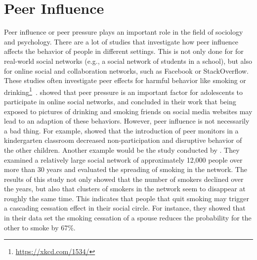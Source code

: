 

\section{Peer Influence}
\label{sec:peer-influence}

Peer influence or peer pressure plays an important role in the field of sociology and psychology.
There are a lot of studies that investigate how peer influence affects the behavior of people in different settings.
This is not only done for for real-world social networks (e.g., a social network of students in a school), but also for online social and collaboration networks, such as Facebook or StackOverflow.
These studies often investigate peer effects for harmful behavior like smoking or drinking\footnote{\url{https://xkcd.com/1534/}}~\cite{Simons2001, Powell2005}.
\citet{Krasnova2008} showed that peer pressure is an important factor for adolescents to participate in online social networks, and \citet{Huang2014} concluded in their work that being exposed to pictures of drinking and smoking friends on social media websites may lead to an adaption of these behaviors.
However, peer influence is not necessarily a bad thing.
For example, \citet{Smith1984} showed that the introduction of peer monitors in a kindergarten classroom decreased non-participation and disruptive behavior of the other children.
Another example would be the study conducted by \citet{Christakis2008}.
They examined a relatively large social network of approximately 12,000 people over more than 30 years and evaluated the spreading of smoking in the network.
The results of this study  not only showed that the number of smokers declined over the years, but also that clusters of smokers in the network seem to disappear at roughly the same time.
This indicates that people that quit smoking may trigger a cascading cessation effect in their social circle.
For instance, they showed that in their data set the smoking cessation of a spouse reduces the probability for the other to smoke by 67\%.

